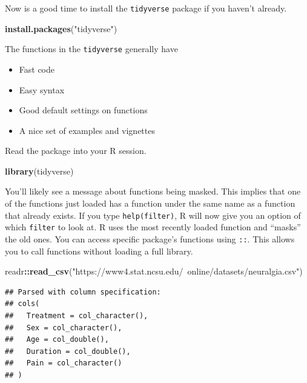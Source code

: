 \documentclass[
]{book}
\newenvironment{Shaded}{\begin{snugshade}}{\end{snugshade}}
\newcommand{\KeywordTok}[1]{\textcolor[rgb]{0.13,0.29,0.53}{\textbf{#1}}}
\newcommand{\NormalTok}[1]{#1}
\newcommand{\OperatorTok}[1]{\textcolor[rgb]{0.81,0.36,0.00}{\textbf{#1}}}
\newcommand{\StringTok}[1]{\textcolor[rgb]{0.31,0.60,0.02}{#1}}
\theoremstyle{definition}
\theoremstyle{definition}
\theoremstyle{definition}
\theoremstyle{remark}
\begin{document}
Now is a good time to install the \texttt{tidyverse} package if you haven't already.

\begin{Shaded}
\begin{Highlighting}[]
\KeywordTok{install.packages}\NormalTok{(}\StringTok{"tidyverse"}\NormalTok{)}
\end{Highlighting}
\end{Shaded}

The functions in the \texttt{tidyverse} generally have

\begin{itemize}
\item
  Fast code
\item
  Easy syntax
\item
  Good default settings on functions
\item
  A nice set of examples and vignettes
\end{itemize}

Read the package into your R session.

\begin{Shaded}
\begin{Highlighting}[]
\KeywordTok{library}\NormalTok{(tidyverse)}
\end{Highlighting}
\end{Shaded}

You'll likely see a message about functions being masked. This implies that one of the functions just loaded has a function under the same name as a function that already exists. If you type \texttt{help(filter)}, R will now give you an option of which \texttt{filter} to look at. R uses the most recently loaded function and ``masks'' the old ones. You can access specific package's functions using \texttt{::}. This allows you to call functions without loading a full library.

\begin{Shaded}
\begin{Highlighting}[]
\NormalTok{readr}\OperatorTok{::}\KeywordTok{read_csv}\NormalTok{(}\StringTok{"https://www4.stat.ncsu.edu/~online/datasets/neuralgia.csv"}\NormalTok{)}
\end{Highlighting}
\end{Shaded}

\begin{verbatim}
## Parsed with column specification:
## cols(
##   Treatment = col_character(),
##   Sex = col_character(),
##   Age = col_double(),
##   Duration = col_double(),
##   Pain = col_character()
## )
\end{verbatim}
\end{document}

